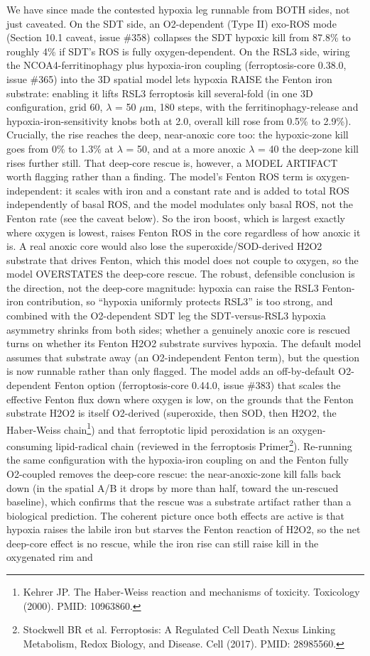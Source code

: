 \documentclass[11pt,twoside,openright]{report}
\begin{document}
We have since made the contested hypoxia leg runnable from BOTH sides, not just caveated. On the SDT side, an O2-dependent (Type II) exo-ROS mode (Section 10.1 caveat, issue \#358) collapses the SDT hypoxic kill from 87.8\% to roughly 4\% if SDT's ROS is fully oxygen-dependent. On the RSL3 side, wiring the NCOA4-ferritinophagy plus hypoxia-iron coupling (ferroptosis-core 0.38.0, issue \#365) into the 3D spatial model lets hypoxia RAISE the Fenton iron substrate: enabling it lifts RSL3 ferroptosis kill several-fold (in one 3D configuration, grid 60, $\lambda$ = 50 $\mu$m, 180 steps, with the ferritinophagy-release and hypoxia-iron-sensitivity knobs both at 2.0, overall kill rose from 0.5\% to 2.9\%). Crucially, the rise reaches the deep, near-anoxic core too: the hypoxic-zone kill goes from 0\% to 1.3\% at $\lambda$ = 50, and at a more anoxic $\lambda$ = 40 the deep-zone kill rises further still. That deep-core rescue is, however, a MODEL ARTIFACT worth flagging rather than a finding. The model's Fenton ROS term is oxygen-independent: it scales with iron and a constant rate and is added to total ROS independently of basal ROS, and the model modulates only basal ROS, not the Fenton rate (see the caveat below). So the iron boost, which is largest exactly where oxygen is lowest, raises Fenton ROS in the core regardless of how anoxic it is. A real anoxic core would also lose the superoxide/SOD-derived H2O2 substrate that drives Fenton, which this model does not couple to oxygen, so the model OVERSTATES the deep-core rescue. The robust, defensible conclusion is the direction, not the deep-core magnitude: hypoxia can raise the RSL3 Fenton-iron contribution, so ``hypoxia uniformly protects RSL3'' is too strong, and combined with the O2-dependent SDT leg the SDT-versus-RSL3 hypoxia asymmetry shrinks from both sides; whether a genuinely anoxic core is rescued turns on whether its Fenton H2O2 substrate survives hypoxia. The default model assumes that substrate away (an O2-independent Fenton term), but the question is now runnable rather than only flagged. The model adds an off-by-default O2-dependent Fenton option (ferroptosis-core 0.44.0, issue \#383) that scales the effective Fenton flux down where oxygen is low, on the grounds that the Fenton substrate H2O2 is itself O2-derived (superoxide, then SOD, then H2O2, the Haber-Weiss chain\footnote{Kehrer JP. The Haber-Weiss reaction and mechanisms of toxicity. Toxicology (2000). PMID: 10963860.}) and that ferroptotic lipid peroxidation is an oxygen-consuming lipid-radical chain (reviewed in the ferroptosis Primer\footnote{Stockwell BR et al. Ferroptosis: A Regulated Cell Death Nexus Linking Metabolism, Redox Biology, and Disease. Cell (2017). PMID: 28985560.}). Re-running the same configuration with the hypoxia-iron coupling on and the Fenton fully O2-coupled removes the deep-core rescue: the near-anoxic-zone kill falls back down (in the spatial A/B it drops by more than half, toward the un-rescued baseline), which confirms that the rescue was a substrate artifact rather than a biological prediction. The coherent picture once both effects are active is that hypoxia raises the labile iron but starves the Fenton reaction of H2O2, so the net deep-core effect is no rescue, while the iron rise can still raise kill in the oxygenated rim and 
\end{document}
